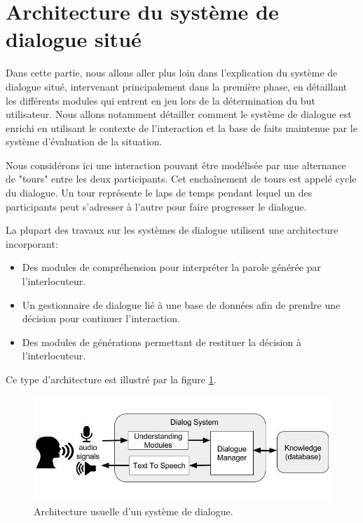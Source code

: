 \documentclass[a4paper,11pt,twoside]{StyleThese}
\begin{document}
\section{Architecture du système de dialogue situé}

Dans cette partie, nous allons aller plus loin dans l'explication du système de dialogue situé, intervenant principalement dans la première phase, en détaillant les différents modules qui entrent en jeu lors de la détermination du but utilisateur. Nous allons notamment détailler comment le système de dialogue est enrichi en utilisant le contexte de l'interaction et la base de faits maintenue par le système d'évaluation de la situation.

Nous considérons ici une interaction pouvant être modélisée par une alternance de "tours" entre les deux participants. Cet enchaînement de tours est appelé cycle du dialogue. Un tour représente le laps de temps pendant lequel un des participants peut s’adresser à l’autre pour faire progresser le dialogue.

La plupart des travaux sur les systèmes de dialogue \cite{Levin97,Young10,thomson2010bayesian} utilisent une architecture incorporant:
\begin{itemize}
\item Des modules de compréhension pour interpréter la parole générée par l'interlocuteur.
\item Un gestionnaire de dialogue lié à une base de données afin de prendre une décision pour continuer l'interaction.
\item Des modules de générations permettant de restituer la décision à l'interlocuteur.
\end{itemize}
Ce type d'architecture est illustré par la figure \ref{fig:archidial}.

\begin{figure}[ht!]
 \centering
  \includegraphics[width=0.99\linewidth]{./img/dialogueSys.jpg} 
  \caption {Architecture usuelle d'un système de dialogue.}
  \label{fig:archidial}
\end{figure}
\end{document}
